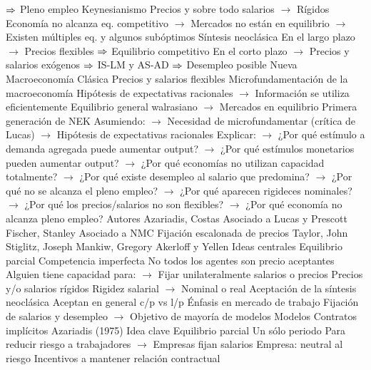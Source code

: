\documentclass{nuevotema}
\begin{document}
\begin{esquemal}
				\4[] $\Rightarrow$ Pleno empleo
				\4 Keynesianismo
				\4[] Precios y sobre todo salarios
				\4[] $\to$ Rígidos
				\4[] Economía no alcanza eq. competitivo
				\4[] $\to$ Mercados no están en equilibrio
				\4[] $\to$ Existen múltiples eq. y algunos subóptimos
				\4 Síntesis neoclásica
				\4[] En el largo plazo
				\4[] $\to$ Precios flexibles
				\4[] $\Rightarrow$ Equilibrio competitivo
				\4[] En el corto plazo
				\4[] $\to$ Precios y salarios exógenos
				\4[] $\Rightarrow$ IS-LM y AS-AD
				\4[] $\Rightarrow$ Desempleo posible
				\4 Nueva Macroeconomía Clásica
				\4[] Precios y salarios flexibles
				\4[] Microfundamentación de la macroeconomía
				\4[] Hipótesis de expectativas racionales
				\4[] $\to$ Información se utiliza eficientemente
				\4[] Equilibrio general walrasiano
				\4[] $\to$ Mercados en equilibrio
				\4 Primera generación de NEK
				\4[] Asumiendo:
				\4[] $\to$ Necesidad de microfundamentar (crítica de Lucas)
				\4[] $\to$ Hipótesis de expectativas racionales
				\4[] Explicar:
				\4[] $\to$ ¿Por qué estímulo a demanda agregada puede aumentar output?
				\4[] $\to$ ¿Por qué estímulos monetarios pueden aumentar output?
				\4[] $\to$ ¿Por qué economías no utilizan capacidad totalmente?
				\4[] $\to$ ¿Por qué existe desempleo al salario que predomina?
				\4[] $\to$ ¿Por qué no se alcanza el pleno empleo?
				\4[] $\to$ ¿Por qué aparecen rigideces nominales?
				\4[] $\to$ ¿Por qué los precios/salarios no son flexibles?
				\4[] $\to$ ¿Por qué economía no alcanza pleno empleo?
			\3 Autores
				\4 Azariadis, Costas
				\4[] Asociado a Lucas y Prescott
				\4 Fischer, Stanley
				\4[] Asociado a NMC
				\4[] Fijación escalonada de precios
				\4 Taylor, John
				\4 Stiglitz, Joseph
				\4 Mankiw, Gregory
				\4 Akerloff y Yellen
			\3 Ideas centrales
				\4 Equilibrio parcial
				\4 Competencia imperfecta
				\4[] No todos los agentes son precio aceptantes
				\4[] Alguien tiene capacidad para:
				\4[] $\to$ Fijar unilateralmente salarios o precios
				\4 Precios y/o salarios rígidos
				\4[] Rigidez salarial
				\4[] $\to$ Nominal o real
				\4 Aceptación de la síntesis neoclásica
				\4[] Aceptan en general c/p vs l/p
				\4 Énfasis en mercado de trabajo
				\4[] Fijación de salarios y desempleo
				\4[] $\to$ Objetivo de mayoría de modelos
		\2 Modelos
			\3 Contratos implícitos
				\4 Azariadis (1975)
				\4 Idea clave
				\4[] Equilibrio parcial
				\4[] Un sólo periodo
				\4[] Para reducir riesgo a trabajadores
				\4[] $\to$ Empresas fijan salarios
				\4 Empresa:
				\4[] neutral al riesgo
				\4[] Incentivos a mantener relación contractual

\end{esquemal}
\end{document}
